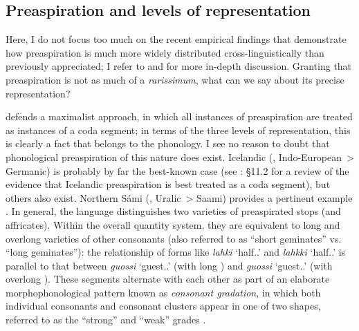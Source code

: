 \documentclass[output=paper,colorlinks,citecolor=brown]{langscibook}
\begin{document}
\subsection{Preaspiration and levels of representation}
\label{sec:preasp-levels-repr}

Here, I do not focus too much on the recent empirical findings that demonstrate how preaspiration is much more widely distributed cross\hyp linguistically than previously appreciated; I refer to  and  for more in-depth discussion. Granting that preaspiration is not as much of a \emph{rarissimum}, what can we say about its precise representation?

 defends a maximalist approach, in which all instances of preaspiration are treated as instances of a coda \ipa{[h]} segment; in terms of the three levels of representation, this is clearly a fact that belongs to the phonology. I see no reason to doubt that phonological preaspiration of this nature does exist. Icelandic (, Indo-European~> Germanic) is probably by far the best\hyp known case (see \citealt{árnason2011icelandic}: §11.2 for a review of the evidence that Icelandic preaspiration is best treated as a coda segment), but others also exist. Northern Sámi (, Uralic~> Saami) provides a pertinent example \parencite{sammallahti1998saami, sammallahti2019láidehus, bye2001virtual, aikio2022north}. In general, the language distinguishes two varieties of preaspirated stops (and affricates). Within the overall quantity system, they are equivalent to long and overlong varieties of other consonants (also referred to as \enquote{short geminates} vs. \enquote{long geminates}): the relationship of forms like \textit{lahki} `half.\Gen.\Sg' and \textit{lahkki} `half.\Nom.\Sg' is parallel to that between \textit{guossi} `guest.\Gen.\Sg' (with long \ipa{[sː]}) and \textit{guos\textquotesingle si} `guest.\Nom.\Sg' (with overlong \ipa{[sːs]}). These segments alternate with each other as part of an elaborate morphophonological pattern known as \emph{consonant gradation}, in which both individual consonants and consonant clusters appear in one of two shapes, referred to as the \enquote{strong} and \enquote{weak} grades \parencite[for an overview, see][]{bakró-nagy2022consonant}.
\end{document}
